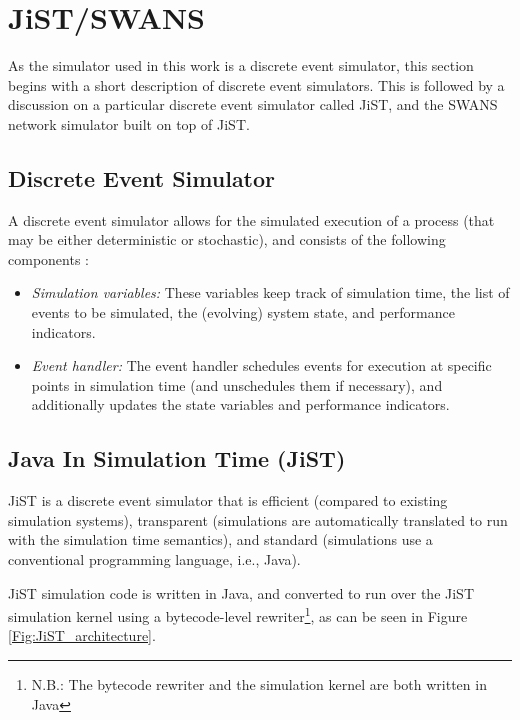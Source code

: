 \section {JiST/SWANS} \label{sec:jistswans}

As the simulator used in this work is a discrete event simulator, this section 
begins with a short description of discrete event simulators. 
This is followed by a discussion on a particular discrete event simulator
called JiST, and the SWANS network simulator built on top of JiST.

\subsection{Discrete Event Simulator}

A discrete event simulator allows for the simulated execution of a process (that
may be either deterministic or stochastic), and consists of the following
components \cite{Shankar_DiscreteEventSim}:

\begin{itemize}
  \item \emph{Simulation variables:} These variables keep track of simulation 
  time, the list of events to be simulated, the (evolving) system state, and 
  performance indicators.
  \item \emph{Event handler:} The event handler schedules events for execution 
  at specific points in simulation time (and unschedules them if necessary), 
  and additionally updates the state variables and performance indicators.
\end{itemize}
 
\subsection{Java In Simulation Time (JiST)} \label{subsec:jist}

JiST \cite{barr_JIST:2005} is a discrete event simulator that is 
efficient (compared to existing simulation systems), 
transparent (simulations are automatically translated to run with the 
simulation time semantics), and standard (simulations use a
conventional programming language, i.e., Java).

JiST simulation code is written in Java, and converted to run over the JiST 
simulation kernel using a bytecode-level rewriter\footnote{N.B.: The bytecode 
rewriter and the simulation kernel are both written in Java},  as can be seen 
in Figure \ref{Fig:JiST_architecture}.

